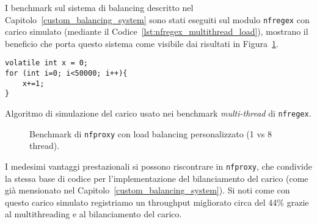 I benchmark sul sistema di balancing descritto nel Capitolo~\ref{custom_balancing_system} sono stati eseguiti sul modulo \texttt{\gls{nfregex}} con carico simulato (mediante il Codice~\ref{lst:nfregex_multithread_load}), mostrano il beneficio che porta questo sistema come visibile dai risultati in Figura~\ref{fig:nfproxy_multithread_benchmark}.

\begin{listing}[H]
\begin{verbatim}
volatile int x = 0;
for (int i=0; i<50000; i++){
    x+=1;
}
\end{verbatim}
\vspace{-1em}
\caption{Algoritmo di simulazione del carico usato nei benchmark \textit{multi-thread} di \texttt{nfregex}.}\label{lst:nfregex_multithread_load}
\end{listing}

\begin{figure}[H]
    \centering
    
    \caption{Benchmark di \texttt{\gls{nfproxy}} con load balancing personalizzato (1 vs 8 thread).}\label{fig:nfproxy_multithread_benchmark}
\end{figure}

I medesimi vantaggi prestazionali si possono riscontrare in \texttt{\gls{nfproxy}}, che condivide la stessa base di codice per l'implementazione del bilanciamento del carico (come già mensionato nel Capitolo~\ref{custom_balancing_system}). Si noti come con questo carico simulato registriamo un throughput migliorato circa del 44\% grazie al multithreading e al bilanciamento del carico.
